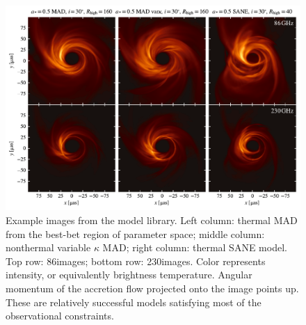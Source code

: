 
\begin{figure}
  \centering
  \includegraphics[width=\textwidth]{figures/example_imgs.pdf}
  \caption{Example images from the model library.
    Left column: thermal MAD from the best-bet region of parameter space; middle column: nonthermal variable $\kappa$ MAD; right column: thermal SANE model.
    Top row: 86\GHz images; bottom row: 230\GHz images.
    Color represents intensity, or equivalently brightness temperature.
    Angular momentum of the accretion flow projected onto the image points up.
    These are relatively successful models satisfying most of the observational  constraints.}
  \label{fig:example_imgs}
\end{figure}

